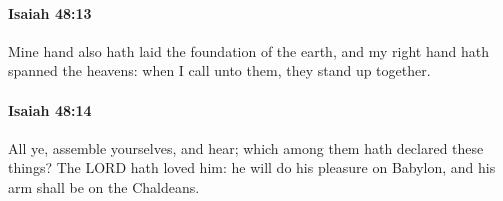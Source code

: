 		\paragraph{Isaiah 48:13} %
			\label{ISAIAH-48-13}

			Mine hand also hath laid the foundation of the earth, and my right hand hath spanned the heavens: when I call unto them, they stand up together.


		\paragraph{Isaiah 48:14} %
			\label{ISAIAH-48-14}

			All ye, assemble yourselves, and hear; which among them hath declared these things? The LORD hath loved him: he will do his pleasure on Babylon, and his arm shall be on the Chaldeans.


